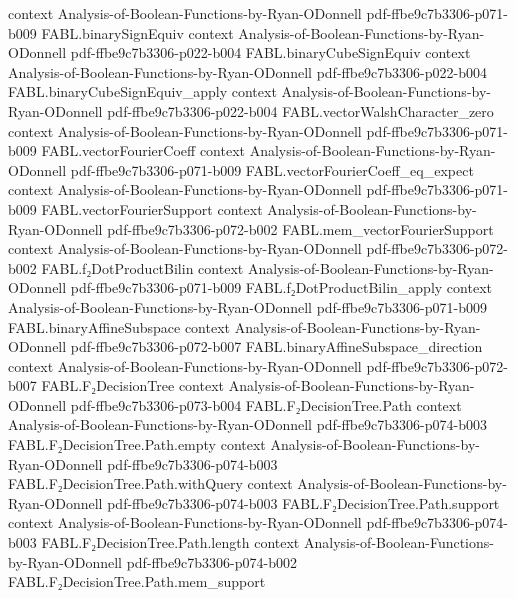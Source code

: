 \begin{theorem}
  {context}
  {Analysis-of-Boolean-Functions-by-Ryan-ODonnell}
  {pdf-ffbe9c7b3306-p071-b009}
\proofstep
  {FABL.binarySignEquiv}
  {context}
  {Analysis-of-Boolean-Functions-by-Ryan-ODonnell}
  {pdf-ffbe9c7b3306-p022-b004}
\proofstep
  {FABL.binaryCubeSignEquiv}
  {context}
  {Analysis-of-Boolean-Functions-by-Ryan-ODonnell}
  {pdf-ffbe9c7b3306-p022-b004}
\proofstep
  {FABL.binaryCubeSignEquiv_apply}
  {context}
  {Analysis-of-Boolean-Functions-by-Ryan-ODonnell}
  {pdf-ffbe9c7b3306-p022-b004}
\proofstep
  {FABL.vectorWalshCharacter_zero}
  {context}
  {Analysis-of-Boolean-Functions-by-Ryan-ODonnell}
  {pdf-ffbe9c7b3306-p071-b009}
\proofstep
  {FABL.vectorFourierCoeff}
  {context}
  {Analysis-of-Boolean-Functions-by-Ryan-ODonnell}
  {pdf-ffbe9c7b3306-p071-b009}
\proofstep
  {FABL.vectorFourierCoeff_eq_expect}
  {context}
  {Analysis-of-Boolean-Functions-by-Ryan-ODonnell}
  {pdf-ffbe9c7b3306-p071-b009}
\proofstep
  {FABL.vectorFourierSupport}
  {context}
  {Analysis-of-Boolean-Functions-by-Ryan-ODonnell}
  {pdf-ffbe9c7b3306-p072-b002}
\proofstep
  {FABL.mem_vectorFourierSupport}
  {context}
  {Analysis-of-Boolean-Functions-by-Ryan-ODonnell}
  {pdf-ffbe9c7b3306-p072-b002}
\proofstep
  {FABL.f₂DotProductBilin}
  {context}
  {Analysis-of-Boolean-Functions-by-Ryan-ODonnell}
  {pdf-ffbe9c7b3306-p071-b009}
\proofstep
  {FABL.f₂DotProductBilin_apply}
  {context}
  {Analysis-of-Boolean-Functions-by-Ryan-ODonnell}
  {pdf-ffbe9c7b3306-p071-b009}
\proofstep
  {FABL.binaryAffineSubspace}
  {context}
  {Analysis-of-Boolean-Functions-by-Ryan-ODonnell}
  {pdf-ffbe9c7b3306-p072-b007}
\proofstep
  {FABL.binaryAffineSubspace_direction}
  {context}
  {Analysis-of-Boolean-Functions-by-Ryan-ODonnell}
  {pdf-ffbe9c7b3306-p072-b007}
\proofstep
  {FABL.F₂DecisionTree}
  {context}
  {Analysis-of-Boolean-Functions-by-Ryan-ODonnell}
  {pdf-ffbe9c7b3306-p073-b004}
\proofstep
  {FABL.F₂DecisionTree.Path}
  {context}
  {Analysis-of-Boolean-Functions-by-Ryan-ODonnell}
  {pdf-ffbe9c7b3306-p074-b003}
\proofstep
  {FABL.F₂DecisionTree.Path.empty}
  {context}
  {Analysis-of-Boolean-Functions-by-Ryan-ODonnell}
  {pdf-ffbe9c7b3306-p074-b003}
\proofstep
  {FABL.F₂DecisionTree.Path.withQuery}
  {context}
  {Analysis-of-Boolean-Functions-by-Ryan-ODonnell}
  {pdf-ffbe9c7b3306-p074-b003}
\proofstep
  {FABL.F₂DecisionTree.Path.support}
  {context}
  {Analysis-of-Boolean-Functions-by-Ryan-ODonnell}
  {pdf-ffbe9c7b3306-p074-b003}
\proofstep
  {FABL.F₂DecisionTree.Path.length}
  {context}
  {Analysis-of-Boolean-Functions-by-Ryan-ODonnell}
  {pdf-ffbe9c7b3306-p074-b002}
\proofstep
  {FABL.F₂DecisionTree.Path.mem_support}

\end{theorem}
